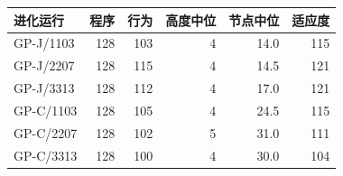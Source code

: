 \begin{tabular}{@{}lrrrrr@{}}
\toprule
进化运行 & 程序 & 行为 & 高度中位 & 节点中位 & 适应度 \\ \midrule
GP-J/1103 & 128 & 103 & 4 & 14.0 & 115 \\
GP-J/2207 & 128 & 115 & 4 & 14.5 & 121 \\
GP-J/3313 & 128 & 112 & 4 & 17.0 & 121 \\
GP-C/1103 & 128 & 105 & 4 & 24.5 & 115 \\
GP-C/2207 & 128 & 102 & 5 & 31.0 & 111 \\
GP-C/3313 & 128 & 100 & 4 & 30.0 & 104 \\
\bottomrule
\end{tabular}
